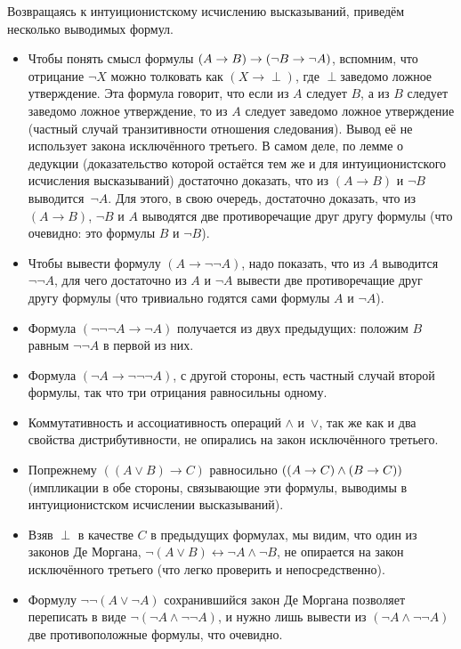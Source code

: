 Возвращаясь к интуиционистскому исчислению высказываний, приведём
несколько выводимых формул.
\begin{itemize}
        \item
Чтобы понять смысл формулы $(A\hm\to B)\hm\to (\lnot B\hm\to\lnot A)$,
вспомним, что отрицание $\lnot X$ можно толковать как
$(X\to\perp)$, где $\perp$\т заведомо ложное утверждение. Эта
формула говорит, что если из $A$ следует $B$, а из $B$ следует
заведомо ложное утверждение, то из $A$ следует заведомо ложное
утверждение (частный случай транзитивности отношения
следования). Вывод её не использует закона исключённого
третьего. В самом деле, по лемме о дедукции%
(доказательство
которой остаётся тем же и для интуиционистского исчисления
высказываний) достаточно доказать, что из $(A\to B)$ и $\lnot B$
выводится~$\lnot A$. Для этого, в свою очередь, достаточно
доказать, что из $(A\to B)$, $\lnot B$ и $A$ выводятся две
противоречащие друг другу формулы (что очевидно: это формулы $B$
и $\lnot B$).
        \item
Чтобы вывести формулу
$(A\to\lnot\lnot A)$, надо показать, что из $A$
выводится $\lnot\lnot A$, для чего достаточно из $A$ и $\lnot A$
вывести две противоречащие друг другу формулы (что тривиально\т
годятся сами формулы $A$ и $\lnot A$).
        \item
Формула
$(\lnot\lnot\lnot A\to \lnot A)$ получается из двух
предыдущих: положим $B$ равным $\lnot\lnot A$ в первой из них.
        \item
Формула $(\lnot A\to \lnot\lnot\lnot A)$, с другой стороны, есть частный
случай второй формулы, так что три отрицания равносильны одному.
        \item
Коммутативность и ассоциативность операций $\land$ и~$\lor$, так
же как и два свойства дистрибутивности, не опирались на закон
исключённого третьего.
        \item
По\д прежнему $((A\lor B)\to C)$ равносильно $((A\to C)\hm\land
(B\to C))$ (импликации в обе стороны, связывающие эти формулы,
выводимы в интуиционистском исчислении высказываний).
        \item
Взяв $\perp$ в качестве $C$ в предыдущих формулах, мы видим,
что один из законов Де Моргана,%
%
${\lnot (A\lor B)\leftrightarrow
\lnot A \land \lnot B}$, не опирается на закон исключённого третьего
(что легко проверить и непосредственно).
        \item
Формулу
$\lnot\lnot (A\lor \lnot A)$ сохранившийся закон Де Моргана
позволяет переписать в виде $\lnot (\lnot A \land \lnot\lnot A)$,
и нужно лишь вывести из $(\lnot A \land \lnot\lnot A)$ две противоположные
формулы, что очевидно.
        \end{itemize}

